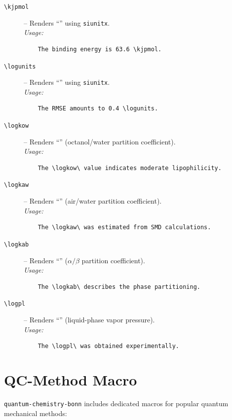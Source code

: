 \documentclass[a4paper,12pt]{article}
\begin{document}
\begin{description}
    \item[\texttt{\textbackslash kjpmol}] – Renders ``\kjpmol'' using \texttt{siunitx}. \\
    \textit{Usage:} 
    \begin{verbatim}
    The binding energy is 63.6 \kjpmol.
    \end{verbatim}

    \item[\texttt{\textbackslash logunits}] – Renders ``\logunits'' using \texttt{siunitx}. \\
    \textit{Usage:} 
    \begin{verbatim}
    The RMSE amounts to 0.4 \logunits.
    \end{verbatim}

    \item[\texttt{\textbackslash logkow}] – Renders ``\logkow'' (octanol/water partition coefficient). \\
    \textit{Usage:} 
    \begin{verbatim}
    The \logkow\ value indicates moderate lipophilicity.
    \end{verbatim}

    \item[\texttt{\textbackslash logkaw}] – Renders ``\logkaw'' (air/water partition coefficient). \\
    \textit{Usage:} 
    \begin{verbatim}
    The \logkaw\ was estimated from SMD calculations.
    \end{verbatim}

    \item[\texttt{\textbackslash logkab}] – Renders ``\logkab'' ($\alpha/\beta$ partition coefficient). \\
    \textit{Usage:} 
    \begin{verbatim}
    The \logkab\ describes the phase partitioning.
    \end{verbatim}

    \item[\texttt{\textbackslash logpl}] – Renders ``\logpl'' (liquid-phase vapor pressure). \\
    \textit{Usage:} 
    \begin{verbatim}
    The \logpl\ was obtained experimentally.
    \end{verbatim}
\end{description}

\section{QC-Method Macro}
\label{sec:qcmethods}
\texttt{quantum-chemistry-bonn} includes  dedicated macros for popular quantum mechanical methods:
\end{document}
